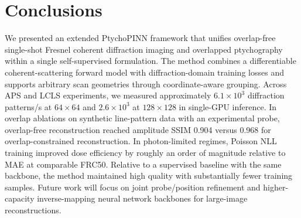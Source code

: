 \documentclass{optica-article}
\begin{document}
\section{Conclusions}
We presented an extended PtychoPINN framework that unifies overlap-free single-shot Fresnel coherent diffraction imaging and overlapped ptychography within a single self-supervised formulation. The method combines a differentiable coherent-scattering forward model with diffraction-domain training losses and supports arbitrary scan geometries through coordinate-aware grouping. Across APS and LCLS experiments, we measured approximately $6.1\times10^3$ diffraction patterns/s at $64\times64$ and $2.6\times10^3$ at $128\times128$ in single-GPU inference. In overlap ablations on synthetic line-pattern data with an experimental probe, overlap-free reconstruction reached amplitude SSIM 0.904 versus 0.968 for overlap-constrained reconstruction. In photon-limited regimes, Poisson NLL training improved dose efficiency by roughly an order of magnitude relative to MAE at comparable FRC50. Relative to a supervised baseline with the same backbone, the method maintained high quality with substantially fewer training samples. Future work will focus on joint probe/position refinement and higher-capacity inverse-mapping neural network backbones for large-image reconstructions.

\newpage
\end{document}
